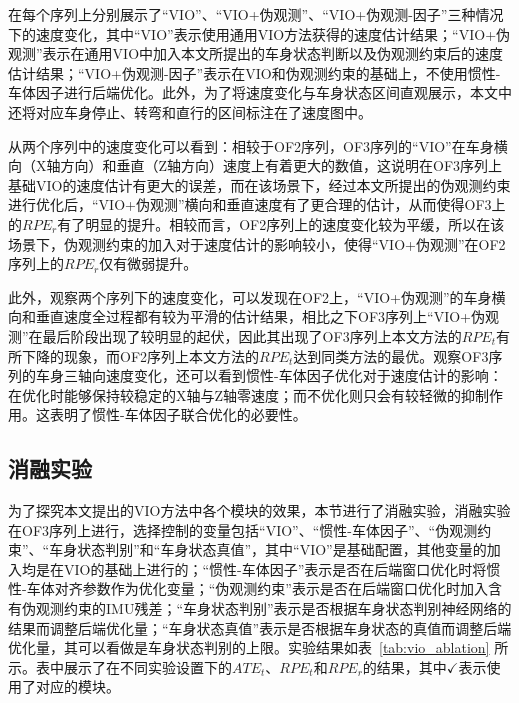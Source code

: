 在每个序列上分别展示了“VIO”、“VIO+伪观测”、“VIO+伪观测-因子”三种情况下的速度变化，其中“VIO”表示使用通用VIO方法获得的速度估计结果；“VIO+伪观测”表示在通用VIO中加入本文所提出的车身状态判断以及伪观测约束后的速度估计结果；“VIO+伪观测-因子”表示在VIO和伪观测约束的基础上，不使用惯性-车体因子进行后端优化。此外，为了将速度变化与车身状态区间直观展示，本文中还将对应车身停止、转弯和直行的区间标注在了速度图中。

从两个序列中的速度变化可以看到：相较于OF2序列，OF3序列的“VIO”在车身横向（X轴方向）和垂直（Z轴方向）速度上有着更大的数值，这说明在OF3序列上基础VIO的速度估计有更大的误差，而在该场景下，经过本文所提出的伪观测约束进行优化后，“VIO+伪观测”横向和垂直速度有了更合理的估计，从而使得OF3上的$RPE_r$有了明显的提升。相较而言，OF2序列上的速度变化较为平缓，所以在该场景下，伪观测约束的加入对于速度估计的影响较小，使得“VIO+伪观测”在OF2序列上的$RPE_r$仅有微弱提升。

此外，观察两个序列下的速度变化，可以发现在OF2上，“VIO+伪观测”的车身横向和垂直速度全过程都有较为平滑的估计结果，相比之下OF3序列上“VIO+伪观测”在最后阶段出现了较明显的起伏，因此其出现了OF3序列上本文方法的$RPE_t$有所下降的现象，而OF2序列上本文方法的$RPE_t$达到同类方法的最优。观察OF3序列的车身三轴向速度变化，还可以看到惯性-车体因子优化对于速度估计的影响：在优化时能够保持较稳定的X轴与Z轴零速度；而不优化则只会有较轻微的抑制作用。这表明了惯性-车体因子联合优化的必要性。


\subsection{消融实验}
为了探究本文提出的VIO方法中各个模块的效果，本节进行了消融实验，消融实验在OF3序列上进行，选择控制的变量包括“VIO”、“惯性-车体因子”、“伪观测约束”、“车身状态判别”和“车身状态真值”，其中“VIO”是基础配置，其他变量的加入均是在VIO的基础上进行的；“惯性-车体因子”表示是否在后端窗口优化时将惯性-车体对齐参数作为优化变量；“伪观测约束”表示是否在后端窗口优化时加入含有伪观测约束的IMU残差；“车身状态判别”表示是否根据车身状态判别神经网络的结果而调整后端优化量；“车身状态真值”表示是否根据车身状态的真值而调整后端优化量，其可以看做是车身状态判别的上限。实验结果如表~\ref{tab:vio_ablation} 所示。表中展示了在不同实验设置下的$ATE_t$、$RPE_t$和$RPE_r$的结果，其中$\checkmark$表示使用了对应的模块。

